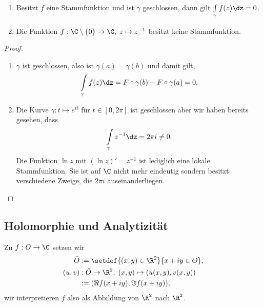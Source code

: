 \begin{cor}
\label{prop:2.23}
\begin{enumerate}
  \item Besitzt $f$ eine Stammfunktion und ist $\gamma$ geschlossen, dann gilt
  $\int\limits_\gamma f(z)\dz = 0$.
  \item Die Funktion $f:\C\setminus\{0\}\to\C,\; z\mapsto z^{-1}$ besitzt keine
  Stammfunktion.\fishhere
\end{enumerate}
\end{cor}
\begin{proof}
\begin{enumerate}
  \item $\gamma$ ist geschlossen, also ist $\gamma(a) = \gamma(b)$ und damit
  gilt,
  \begin{align*}
  \int\limits_\gamma f(z)\dz = F\circ\gamma(b) - F\circ\gamma(a) = 0.
  \end{align*}
  \item Die Kurve $\gamma: t\mapsto e^{it}$ für $t\in[0,2\pi]$ ist geschlossen
  aber wir haben bereits gesehen, dass
  \begin{align*}
  \int\limits_\gamma z^{-1}\dz = 2\pi i\neq 0.
  \end{align*}
  Die Funktion $\ln z$ mit $(\ln z)' = z^{-1}$ ist lediglich eine lokale
  Stammfunktion. Sie ist auf $\C$ nicht mehr eindeutig sondern besitzt
  verschiedene Zweige, die $2\pi i$ auseinanderliegen.\qedhere
\end{enumerate}
\end{proof}

\subsection{Holomorphie und Analytizität}

\begin{bem}[Vereinbarung]
\label{bem:2.24}
Zu $f: O\to\C$ setzen wir
\begin{align*}
\tilde{O} &:= \setdef{(x,y)\in\R^2}{x+iy \in O},\\
(u,v) &: \tilde{O}\to\R^2,\;(x,y)\mapsto (u(x,y),v(x,y)) \\ &:= (\Re f(x+iy),\Im
f(x+iy)),
\end{align*}
wir interpretieren $f$ also als Abbildung von $\R^2$ nach $\R^2$.\maphere 
\end{bem}

